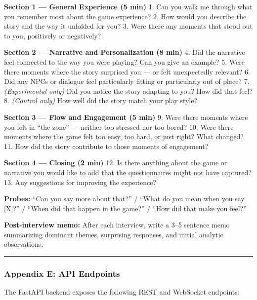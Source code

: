 \textbf{Section 1 --- General Experience (5 min)} 1. Can you walk me
through what you remember most about the game experience? 2. How would
you describe the story and the way it unfolded for you? 3. Were there
any moments that stood out to you, positively or negatively?

\textbf{Section 2 --- Narrative and Personalization (8 min)} 4. Did the
narrative feel connected to the way you were playing? Can you give an
example? 5. Were there moments where the story surprised you --- or felt
unexpectedly relevant? 6. Did any NPCs or dialogue feel particularly
fitting or particularly out of place? 7. \emph{(Experimental only)} Did
you notice the story adapting to you? How did that feel? 8.
\emph{(Control only)} How well did the story match your play style?

\textbf{Section 3 --- Flow and Engagement (5 min)} 9. Were there moments
where you felt in ``the zone'' --- neither too stressed nor too bored?
10. Were there moments where the game felt too easy, too hard, or just
right? What changed? 11. How did the story contribute to those moments
of engagement?

\textbf{Section 4 --- Closing (2 min)} 12. Is there anything about the
game or narrative you would like to add that the questionnaires might
not have captured? 13. Any suggestions for improving the experience?

\textbf{Probes:} ``Can you say more about that?'' / ``What do you mean
when you say {[}X{]}?'' / ``When did that happen in the game?'' / ``How
did that make you feel?''

\textbf{Post-interview memo:} After each interview, write a 3--5
sentence memo summarizing dominant themes, surprising responses, and
initial analytic observations.

\begin{center}\rule{0.5\linewidth}{0.5pt}\end{center}

\subsubsection{Appendix E: API
Endpoints}\label{appendix-e-api-endpoints}

The FastAPI backend exposes the following REST and WebSocket endpoints:

